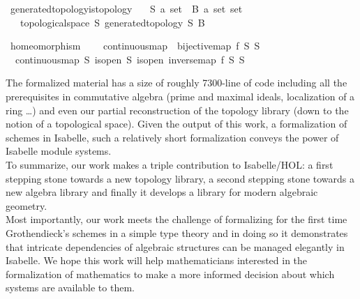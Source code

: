 \documentclass[12pt]{scrartcl}
\begin{document}
\begin{isabelle}
\isamarkupfalse%
\ generated{\isacharunderscore}{\kern0pt}topology{\isacharunderscore}{\kern0pt}is{\isacharunderscore}{\kern0pt}topology{\isacharcolon}{\kern0pt}\isanewline
\ \ \ S{\isacharcolon}{\kern0pt}{\isacharcolon}{\kern0pt}\ {\isachardoublequoteopen}{\isacharprime}{\kern0pt}a\ set{\isachardoublequoteclose}\ \ B{\isacharcolon}{\kern0pt}{\isacharcolon}{\kern0pt}\ {\isachardoublequoteopen}{\isacharprime}{\kern0pt}a\ set\ set{\isachardoublequoteclose}\isanewline
\ \ \ {\isachardoublequoteopen}topological{\isacharunderscore}{\kern0pt}space\ S\ {\isacharparenleft}{\kern0pt}generated{\isacharunderscore}{\kern0pt}topology\ S\ B{\isacharparenright}{\kern0pt}{\isachardoublequoteclose}
\end{isabelle}
\begin{isabelle}
\isamarkupfalse%
\ homeomorphism\ {\isacharequal}{\kern0pt}\ \isanewline
\ \ continuous{\isacharunderscore}{\kern0pt}map\ {\isacharplus}{\kern0pt}\ bijective{\isacharunderscore}{\kern0pt}map\ f\ S\ S{\isacharprime}{\kern0pt}\ {\isacharplus}{\kern0pt}\ \isanewline
\ \ continuous{\isacharunderscore}{\kern0pt}map\ S{\isacharprime}{\kern0pt}\ is{\isacharunderscore}{\kern0pt}open{\isacharprime}{\kern0pt}\ S\ is{\isacharunderscore}{\kern0pt}open\ {\isachardoublequoteopen}inverse{\isacharunderscore}{\kern0pt}map\ f\ S\ S{\isacharprime}{\kern0pt}{\isachardoublequoteclose}
\end{isabelle}
The formalized material has a size of roughly 7300-line of code including all the prerequisites in commutative  algebra (prime and maximal ideals, localization of a ring \dots) and even our partial reconstruction of the topology library (down to the notion of a topological space). Given the output of this work, a formalization of schemes in Isabelle, such a relatively short formalization conveys the power of Isabelle module systems. \\
To summarize, our work makes a triple contribution to Isabelle/HOL: a first stepping stone towards a new topology library, a second stepping stone towards a new algebra library and finally it develops a library for modern algebraic geometry. \\
Most importantly, our work meets the challenge of formalizing for the first time Grothendieck's schemes in a simple type theory and in doing so it demonstrates that intricate dependencies of algebraic structures can be managed elegantly in Isabelle. We hope this work will help mathematicians interested in the formalization of mathematics to make a more informed decision about which systems are available to them. \\
\end{document}
